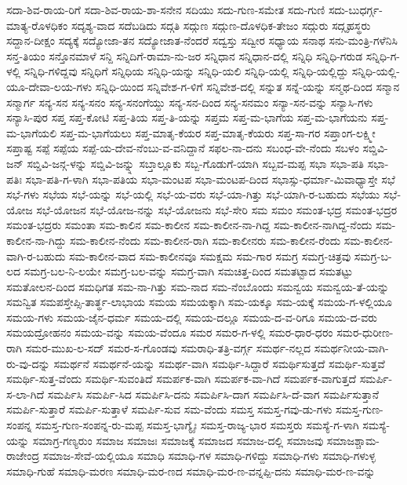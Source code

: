 ಸದಾ-ಶಿವ-ರಾಯ-ರಿಗೆ
ಸದಾ-ಶಿವ-ರಾಯ-ಶಾ-ಸನೇನ
ಸದಿಯು
ಸದು-ಗುಣ-ಸಮೇತ
ಸದು-ಗುಣಿ
ಸದು-ಬುಧರ್ಗ್ಗ-ಮಾತ್ಯ-ರೊಳಧಿಕಂ
ಸದೃಶ್ಯ-ವಾದ
ಸದೆಬಡಿದು
ಸದ್ಗತಿ
ಸದ್ಗುಣ
ಸದ್ಗುಣ-ದೊಳಧಿಕ-ತೇಜಂ
ಸದ್ಗುರು
ಸದ್ಗೃಹಸ್ಥರು
ಸದ್ದಾನ-ದೀಕ್ಷಂ
ಸದ್ಯಕ್ಕೆ
ಸದ್ಯೋಜಾ-ತನ
ಸದ್ಯೋಜಾತ-ನೆಂದರೆ
ಸದ್ವಸ್ತು
ಸದ್ವೀರ
ಸಧ್ಯಾಯ
ಸನಾಥ
ಸನು-ಮಂತ್ರಿ-ಗಳೆನಿಸಿ
ಸನ್ತ-ತಿಯಂ
ಸನ್ತೊನಮಾಳೆ
ಸನ್ದಿ
ಸನ್ನಿದಿಗೆ-ರಾಮಾ-ನು-ಜರ
ಸನ್ನಿಧಾನ
ಸನ್ನಿಧಾನ-ದಲ್ಲಿ
ಸನ್ನಿಧಿ
ಸನ್ನಿಧಿ-ಗರುಡ
ಸನ್ನಿಧಿ-ಗ-ಳಲ್ಲಿ
ಸನ್ನಿಧಿ-ಗಳಿದ್ದವು
ಸನ್ನಿಧಿಗೆ
ಸನ್ನಿಧಿಯ
ಸನ್ನಿಧಿ-ಯನ್ನು
ಸನ್ನಿಧಿ-ಯಲಿ
ಸನ್ನಿಧಿ-ಯಲ್ಲಿ
ಸನ್ನಿಧಿ-ಯಲ್ಲಿದ್ದು
ಸನ್ನಿಧಿ-ಯಲ್ಲಿ-ಯೂ-ದೇವಾ-ಲಯ-ಗಳು
ಸನ್ನಿಧಿ-ಯಿಂದ
ಸನ್ನಿವೇಶ-ಗ-ಳಿಗೆ
ಸನ್ನಿವೇಶ-ದಲ್ಲಿ
ಸನ್ನುತ
ಸನ್ನೆ-ಯನ್ನು
ಸನ್ಮಥ-ದಿಂದ
ಸನ್ಮಾನ
ಸನ್ಮಾರ್ಗ
ಸನ್ಯ-ಸನ
ಸನ್ಯ-ಸನಂ
ಸನ್ಯ-ಸನಂಗೆಯ್ದು
ಸನ್ಯ-ಸನ-ದಿಂದ
ಸನ್ಯ-ಸನಮಂ
ಸನ್ಯಾ-ಸನ-ವನ್ನು
ಸನ್ಯಾಸಿ-ಗಳು
ಸನ್ಯಾಸಿ-ಪುರ
ಸಪ್ತ
ಸಪ್ತ-ಕೋಟಿ
ಸಪ್ತ-ತಿಯ
ಸಪ್ತ-ತಿ-ಯನ್ನು
ಸಪ್ತಮ
ಸಪ್ತ-ಮ-ಭಾಗೆಯ
ಸಪ್ತ-ಮ-ಭಾಗೆಯನು
ಸಪ್ತ-ಮ-ಭಾಗೆಯಲಿ
ಸಪ್ತ-ಮ-ಭಾಗೆಯಲು
ಸಪ್ತ-ಮಾತೃ-ಕೆಯರ
ಸಪ್ತ-ಮಾತೃ-ಕೆಯರು
ಸಪ್ತ-ಸಾ-ಗರ
ಸಪ್ತಾಂಗ-ಲಕ್ಷ್ಮೀ
ಸಪ್ತಾಷ್ಟ
ಸಪ್ಪೆ
ಸಪ್ಪೆಯ
ಸಪ್ಪೆ-ಯ-ದೇವ-ನೆಂಬು-ವ-ವನಿದ್ದಾನೆ
ಸಫಲ-ನಾ-ದನು
ಸಬಂಧ-ವೇ-ನೆಂದು
ಸಬಳಂ
ಸಬ್ಡಿವಿ-ಜನ್
ಸಬ್ಡಿವಿ-ಜನ್ಗ-ಳನ್ನು
ಸಬ್ಡಿವಿ-ಜನ್ನ್ನು
ಸಬ್ತಾಲ್ಲೂಕು
ಸಬ್ಬ-ಗೊಡುಗೆ-ಯಾಗಿ
ಸಬ್ಬವ-ಮಪ್ಪ
ಸಭಾ
ಸಭಾ-ಪತಿ
ಸಭಾ-ಪತಿಃ
ಸಭಾ-ಪತಿ-ಗ-ಳಾಗಿ
ಸಭಾ-ಪತಿಯ
ಸಭಾ-ಮಂಟಪ
ಸಭಾ-ಮಂಟಪ-ದಿಂದ
ಸಭಾಸ್ಸು-ಧರ್ಮಾ-ಮಿವಾಧ್ಯಾಸ್ತೇ
ಸಭೆ
ಸಭೆ-ಗಳು
ಸಭೆಯ
ಸಭೆ-ಯನ್ನು
ಸಭೆ-ಯಲ್ಲಿ
ಸಭೆ-ಯ-ವರು
ಸಭೆ-ಯಾ-ಗಿತ್ತು
ಸಭೆ-ಯಾಗಿ-ರ-ಬಹುದು
ಸಭೆಯು
ಸಭೆ-ಯೋಜ
ಸಭೆ-ಯೋಜನ
ಸಭೆ-ಯೋಜ-ನನ್ನು
ಸಭೆ-ಯೋಜನು
ಸಭೆ-ಸೇರಿ
ಸಮ
ಸಮಂ
ಸಮಂತ-ಭದ್ರ
ಸಮಂತ-ಭದ್ರರ
ಸಮಂತ-ಭದ್ರರು
ಸಮಂತಾ
ಸಮ-ಕಾಲಿನ
ಸಮ-ಕಾಲೀನ
ಸಮ-ಕಾಲೀನ-ನಾ-ಗಿದ್ದ
ಸಮ-ಕಾಲೀನ-ನಾಗಿದ್ದ-ನೆಂದು
ಸಮ-ಕಾಲೀನ-ನಾ-ಗಿದ್ದು
ಸಮ-ಕಾಲೀನ-ನೆಂದು
ಸಮ-ಕಾಲೀನ-ರಾಗಿ
ಸಮ-ಕಾಲೀನರು
ಸಮ-ಕಾಲೀನ-ರೆಂದು
ಸಮ-ಕಾಲೀನ-ವಾಗಿ-ರ-ಬಹುದು
ಸಮ-ಕಾಲೀನ-ವಾದ
ಸಮ-ಕಾಲೀನವೂ
ಸಮಕ್ಷಮ
ಸಮ-ಗಾರ
ಸಮಗ್ರ
ಸಮಗ್ರ-ಚಿತ್ರವು
ಸಮಗ್ರ-ಬ-ಲದ
ಸಮಗ್ರ-ಬಲ-ನಿ-ಲಯೇ
ಸಮಗ್ರ-ಬಲ-ವನ್ನು
ಸಮಗ್ರ-ವಾಗಿ
ಸಮಚಿತ್ತ-ದಿಂದ
ಸಮತಟ್ಟಾದ
ಸಮತಟ್ಟು
ಸಮತೋಲನ-ದಿಂದ
ಸಮಧಿಗತ
ಸಮ-ನಾ-ಗಿತ್ತು
ಸಮ-ನಾದ
ಸಮ-ನೆಂಬೊಂದು
ಸಮನ್ವಯ
ಸಮನ್ವಯ-ತೆ-ಯನ್ನು
ಸಮನ್ವಿತ
ಸಮಪಸ್ತೇಪ್ಸಿ-ತಾರ್ತ್ಥ-ಲಾಭಾಯ
ಸಮಯ
ಸಮಯಕ್ಕಾಗಿ
ಸಮ-ಯಕ್ಕೂ
ಸಮ-ಯಕ್ಕೆ
ಸಮಯ-ಗ-ಳಲ್ಲಿಯೂ
ಸಮಯ-ಗಳು
ಸಮಯ-ಜೈನ-ಧರ್ಮ
ಸಮಯ-ದಲ್ಲಿ
ಸಮಯ-ದಲ್ಲೂ
ಸಮಯ-ದ-ವ-ರಿಗೂ
ಸಮಯ-ದ-ವರು
ಸಮಯದ್ರೋಹನಂ
ಸಮಯ-ವನ್ನು
ಸಮಯ-ವೆಂದೂ
ಸಮರ
ಸಮರ-ಗ-ಳಲ್ಲಿ
ಸಮರ-ಧಾರ-ಧರಂ
ಸಮರ-ಧುರೀಣ-ರಾಗಿ
ಸಮರ-ಮುಖ-ಲ-ಸದ್
ಸಮರ-ಸ-ಗೊಂಡವು
ಸಮರಾಧಿ-ತತ್ರಿ-ವರ್ಗ್ಗ
ಸಮರ್ಥ-ನಲ್ಲದ
ಸಮರ್ಥನೀಯ-ವಾಗಿ-ರು-ವು-ದನ್ನು
ಸಮರ್ಥನೆ
ಸಮರ್ಥನೆ-ಯನ್ನು
ಸಮರ್ಥ-ವಾಗಿ
ಸಮರ್ಥಿ-ಸಿದ್ದಾರೆ
ಸಮರ್ಥಿಸುತ್ತದೆ
ಸಮರ್ಥಿ-ಸುತ್ತವೆ
ಸಮರ್ಥಿ-ಸುತ್ತ-ವೆಂದು
ಸಮರ್ಥಿ-ಸುವಂತಿದೆ
ಸಮರ್ಪಕ-ವಾಗಿ
ಸಮರ್ಪಕ-ವಾ-ಗಿದೆ
ಸಮರ್ಪಕ-ವಾಗುತ್ತದೆ
ಸಮರ್ಪಿ-ಸ-ಲಾ-ಗಿದೆ
ಸಮರ್ಪಿಸಿ
ಸಮರ್ಪಿ-ಸಿದ
ಸಮರ್ಪಿಸಿ-ದನು
ಸಮರ್ಪಿಸಿ-ದಾಗ
ಸಮರ್ಪಿಸಿ-ದೆ-ವಾಗ
ಸಮರ್ಪಿಸುತ್ತಾನೆ
ಸಮರ್ಪಿ-ಸುತ್ತಾರೆ
ಸಮರ್ಪಿ-ಸುತ್ತಾಳೆ
ಸಮರ್ಪಿ-ಸುವ
ಸಮ-ವೆಂದು
ಸಮಸ್ತ
ಸಮಸ್ತ-ಗವು-ಡು-ಗಳು
ಸಮಸ್ತ-ಗುಣ-ಸಂಪನ್ನ
ಸಮಸ್ತ-ಗುಣ-ಸಂಪನ್ನ-ರು-ಮಪ್ಪ
ಸಮಸ್ತ-ಭಾಗ್ಯೈಃ
ಸಮಸ್ತ-ರಾಜ್ಯ-ಭಾರ
ಸಮಸ್ತರು
ಸಮಸ್ಯೆ-ಗ-ಳಾಗಿ
ಸಮಸ್ಯೆ-ಯನ್ನು
ಸಮಾಗ್ರ-ಗಣ್ಯರುಂ
ಸಮಾಜ
ಸಮಾಜಃ
ಸಮಾಜಕ್ಕೆ
ಸಮಾಜದ
ಸಮಾಜ-ದಲ್ಲಿ
ಸಮಾಜವು
ಸಮಾಜಶ್ಚಾಮ-ರಾಜೇಂದ್ರ
ಸಮಾಜ-ಸೇವೆ-ಯಲ್ಲಿಯೂ
ಸಮಾಧಿ
ಸಮಾಧಿ-ಗಳ
ಸಮಾಧಿ-ಗಳಿದ್ದು
ಸಮಾಧಿ-ಗಳು
ಸಮಾಧಿ-ಗಳುಳ್ಳ
ಸಮಾಧಿ-ಗುಹೆ
ಸಮಾಧಿ-ಮರಣ
ಸಮಾಧಿ-ಮರ-ಣದ
ಸಮಾಧಿ-ಮರ-ಣ-ವನ್ನಪ್ಪಿ-ದನು
ಸಮಾಧಿ-ಮರ-ಣ-ವನ್ನು
